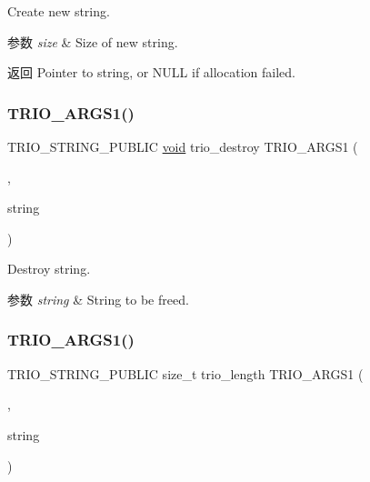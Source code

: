 Create new string.


\begin{DoxyParams}{参数}
{\em size} & Size of new string. \\
\hline
\end{DoxyParams}
\begin{DoxyReturn}{返回}
Pointer to string, or N\+U\+LL if allocation failed. 
\end{DoxyReturn}
\mbox{\label{group___static_strings_gad535775978ae53c5aed97b909d289542}} 
\subsubsection{\texorpdfstring{T\+R\+I\+O\+\_\+\+A\+R\+G\+S1()}{TRIO\_ARGS1()}\hspace{0.1cm}{\footnotesize\ttfamily [2/7]}}
{\footnotesize\ttfamily T\+R\+I\+O\+\_\+\+S\+T\+R\+I\+N\+G\+\_\+\+P\+U\+B\+L\+IC \hyperlink{interfacevoid}{void} trio\+\_\+destroy T\+R\+I\+O\+\_\+\+A\+R\+G\+S1 (\begin{DoxyParamCaption}\item[{(\hyperlink{structstring}{string})}]{,  }\item[{char $\ast$}]{string }\end{DoxyParamCaption})}

Destroy string.


\begin{DoxyParams}{参数}
{\em string} & String to be freed. \\
\hline
\end{DoxyParams}
\mbox{\label{group___static_strings_ga5592dac03631de886d13a188bb8b7eff}} 
\subsubsection{\texorpdfstring{T\+R\+I\+O\+\_\+\+A\+R\+G\+S1()}{TRIO\_ARGS1()}\hspace{0.1cm}{\footnotesize\ttfamily [3/7]}}
{\footnotesize\ttfamily T\+R\+I\+O\+\_\+\+S\+T\+R\+I\+N\+G\+\_\+\+P\+U\+B\+L\+IC size\+\_\+t trio\+\_\+length T\+R\+I\+O\+\_\+\+A\+R\+G\+S1 (\begin{DoxyParamCaption}\item[{(\hyperlink{structstring}{string})}]{,  }\item[{T\+R\+I\+O\+\_\+\+C\+O\+N\+ST char $\ast$}]{string }\end{DoxyParamCaption})}

